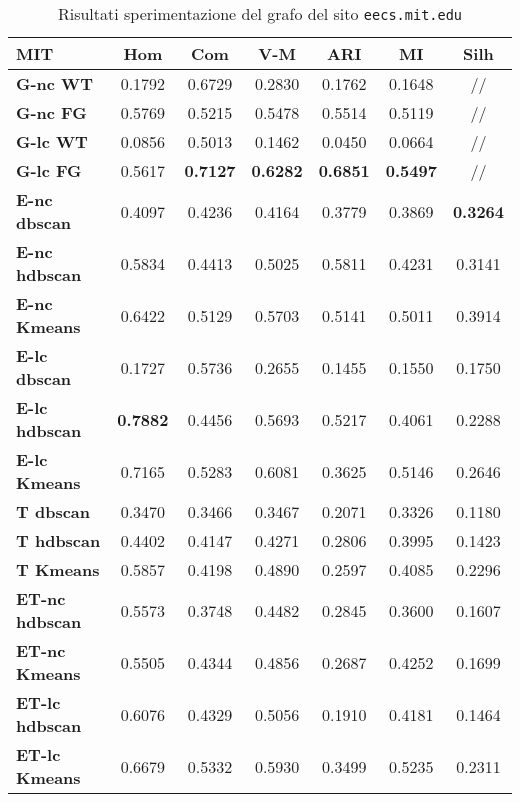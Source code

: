 \begin{table}[H]
	\begin{tabular}{| l | c | c | c | c | c | c |}
	\hline
	\textbf{MIT}  & \textbf{Hom} & \textbf{Com} & \textbf{V-M}  & \textbf{ARI}  & \textbf{MI}  & \textbf{Silh} \\ [2ex] \hline
	\textbf{G-nc WT} & 0.1792 & 0.6729 & 0.2830 & 0.1762 & 0.1648 & // \\ [2ex]
	 \hline
	\textbf{G-nc FG} & 0.5769 & 0.5215 & 0.5478 & 0.5514 & 0.5119 & // \\ [2ex]
	 \hline	
	\textbf{G-lc WT} & 0.0856 & 0.5013 & 0.1462 & 0.0450 & 0.0664 & // \\ [2ex]
	 \hline	
	\textbf{G-lc FG} & 0.5617 & \textbf{0.7127} & \textbf{0.6282} & \textbf{0.6851} & \textbf{0.5497} & // \\ [2ex]
	\hline

	\textbf{E-nc dbscan} & 0.4097 & 0.4236 & 0.4164 & 0.3779 & 0.3869 & \textbf{0.3264}\\ [2ex]
	 \hline 
	\textbf{E-nc hdbscan} & 0.5834 & 0.4413 & 0.5025 & 0.5811 & 0.4231 & 0.3141\\ [2ex]
	 \hline
	\textbf{E-nc Kmeans} & 0.6422 & 0.5129 & 0.5703 & 0.5141 & 0.5011 & 0.3914\\ [2ex]
	 \hline	
	\textbf{E-lc dbscan} & 0.1727 & 0.5736 & 0.2655 & 0.1455 & 0.1550 & 0.1750\\ [2ex]
	\hline
	\textbf{E-lc hdbscan} & \textbf{0.7882} & 0.4456 & 0.5693 & 0.5217 & 0.4061 & 0.2288\\ [2ex]
	\hline
	\textbf{E-lc Kmeans} & 0.7165 & 0.5283 & 0.6081 & 0.3625 & 0.5146 & 0.2646\\ [2ex]
	\hline
	
	\textbf{T dbscan} & 0.3470 & 0.3466 & 0.3467 & 0.2071 & 0.3326 & 0.1180\\ [2ex]
	\hline
	\textbf{T hdbscan} & 0.4402 & 0.4147 & 0.4271 & 0.2806 & 0.3995 & 0.1423\\ [2ex]
	\hline
	\textbf{T Kmeans} & 0.5857 & 0.4198 & 0.4890 & 0.2597 & 0.4085 & 0.2296\\ [2ex]
	\hline
	
	\textbf{ET-nc hdbscan} & 0.5573 & 0.3748 & 0.4482 & 0.2845 & 0.3600 & 0.1607\\ [2ex]
	 \hline
	\textbf{ET-nc Kmeans} & 0.5505 & 0.4344 & 0.4856 & 0.2687 & 0.4252 & 0.1699\\ [2ex]
	 \hline	
	\textbf{ET-lc hdbscan} & 0.6076 & 0.4329 & 0.5056 & 0.1910 & 0.4181 & 0.1464\\ [2ex]
	\hline
	\textbf{ET-lc Kmeans} & 0.6679 & 0.5332 & 0.5930 & 0.3499 & 0.5235 & 0.2311\\ [2ex]
	\hline	
	
	\end{tabular}
	\caption{Risultati sperimentazione del grafo del sito \texttt{eecs.mit.edu}}
	\label{metricheMit}
\end{table}

